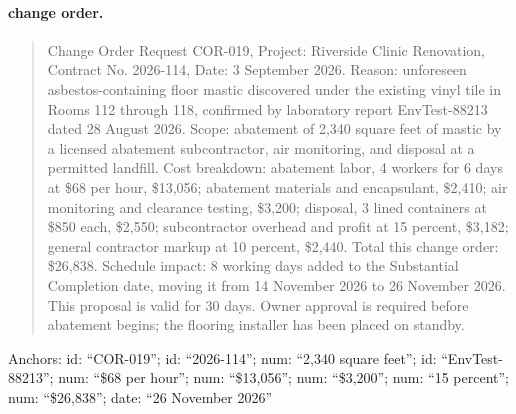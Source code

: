 \paragraph{change order.}
\begin{quote}\small Change Order Request COR-019, Project: Riverside Clinic Renovation, Contract No. 2026-114, Date: 3 September 2026. Reason: unforeseen asbestos-containing floor mastic discovered under the existing vinyl tile in Rooms 112 through 118, confirmed by laboratory report EnvTest-88213 dated 28 August 2026. Scope: abatement of 2,340 square feet of mastic by a licensed abatement subcontractor, air monitoring, and disposal at a permitted landfill. Cost breakdown: abatement labor, 4 workers for 6 days at \$68 per hour, \$13,056; abatement materials and encapsulant, \$2,410; air monitoring and clearance testing, \$3,200; disposal, 3 lined containers at \$850 each, \$2,550; subcontractor overhead and profit at 15 percent, \$3,182; general contractor markup at 10 percent, \$2,440. Total this change order: \$26,838. Schedule impact: 8 working days added to the Substantial Completion date, moving it from 14 November 2026 to 26 November 2026. This proposal is valid for 30 days. Owner approval is required before abatement begins; the flooring installer has been placed on standby.\end{quote}
\noindent\footnotesize Anchors: id: ``COR-019''; id: ``2026-114''; num: ``2,340 square feet''; id: ``EnvTest-88213''; num: ``\$68 per hour''; num: ``\$13,056''; num: ``\$3,200''; num: ``15 percent''; num: ``\$26,838''; date: ``26 November 2026''\normalsize

